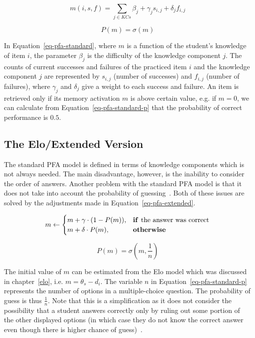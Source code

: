 \begin{equation} \label{eq-pfa-standard}
  m(i,s,f) = \sum_{j \in KCs} \beta_j + \gamma_j s_{i,j} + \delta_j f_{i,j} 
\end{equation}

\begin{equation} \label{eq-pfa-standard-p}
  P(m) = \sigma(m)
\end{equation}

In Equation~\ref{eq-pfa-standard}, where $m$ is a function of the student's knowledge of item $i$, the parameter $\beta_j$ is the difficulty of the knowledge component $j$. The counts of current successes and failures of the practiced item $i$ and the knowledge component $j$ are represented by $s_{i,j}$ (number of successes) and $f_{i,j}$ (number of failures), where $\gamma_j$ and $\delta_j$ give a weight to each success and failure. An item is retrieved only if its memory activation $m$ is above certain value, e.g. if $m = 0$, we can calculate from Equation~\ref{eq-pfa-standard-p} that the probability of correct performance is $0.5$.

\subsection*{The Elo/Extended Version}
\label{pfae}

The standard PFA model is defined in terms of knowledge components which is not always needed. The main disadvantage, however, is the inability to consider the order of answers. Another problem with the standard PFA model is that it does not take into account the probability of guessing~\cite{Papousek2014}. Both of these issues are solved by the adjustments made in Equation~\ref{eq-pfa-extended}.

\begin{equation} \label{eq-pfa-extended}
  m \gets \begin{cases}
            m + \gamma \cdot (1 - P(m)), & \text{\textbf{if }} \text{the answer was correct} \\
            m + \delta \cdot P(m), & \text{\textbf{otherwise}}
          \end{cases}
\end{equation}

\begin{equation} \label{eq-pfa-standard-p}
  P(m) = \sigma\left(m,\frac{1}{n}\right)
\end{equation}

The initial value of $m$ can be estimated from the Elo model which was discussed in chapter~\ref{elo}, i.e. $m = \theta_s - d_i$. The variable $n$ in Equation~\ref{eq-pfa-standard-p} represents the number of options in a multiple-choice question. The probability of guess is thus $\frac{1}{n}$. Note that this is a simplification as it does not consider the possibility that a student answers correctly only by ruling out some portion of the other displayed options (in which case they do not know the correct answer even though there is higher chance of guess)~\cite{Pelanek2015a}.

